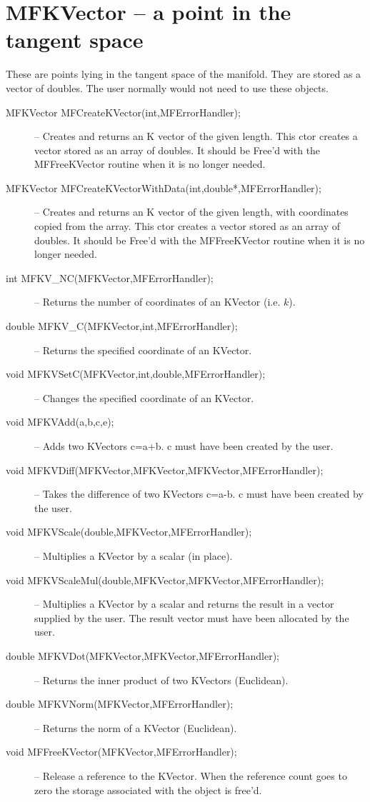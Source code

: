 \documentclass[12pt]{article}
\begin{document}
\section{MFKVector -- a point in the tangent space}
   These are points lying in the tangent space of the manifold. They are stored as a vector of doubles.  
The user normally would not need to use these objects.
\begin{description}
\item [MFKVector MFCreateKVector(int,MFErrorHandler);]
-- Creates and returns an K vector of the given length. This ctor creates a
vector stored as an array of doubles.
It should be Free'd with the MFFreeKVector routine when it is no longer needed.
\item [MFKVector MFCreateKVectorWithData(int,double*,MFErrorHandler);]
-- Creates and returns an K vector of the given length, with coordinates copied
from the array. This ctor creates a vector stored as an array of doubles.
It should be Free'd with the MFFreeKVector routine when it is no longer needed.
\item [int MFKV\_NC(MFKVector,MFErrorHandler);]
-- Returns the number of coordinates of an KVector (i.e. $k$).
\item [double MFKV\_C(MFKVector,int,MFErrorHandler);]
-- Returns the specified coordinate of an KVector.
\item [void MFKVSetC(MFKVector,int,double,MFErrorHandler);]
-- Changes the specified coordinate of an KVector.
\item [void MFKVAdd(a,b,c,e);]
-- Adds two KVectors {c=a+b}. {c} must have been created by the user.
\item [void MFKVDiff(MFKVector,MFKVector,MFKVector,MFErrorHandler);]
-- Takes the difference of two KVectors {c=a-b}. {c} must have been created by the user.
\item [void MFKVScale(double,MFKVector,MFErrorHandler);]
-- Multiplies a KVector by a scalar (in place).
\item [void MFKVScaleMul(double,MFKVector,MFKVector,MFErrorHandler);]
-- Multiplies a KVector by a scalar and returns the result in a vector supplied by the user. The
result vector must have been allocated by the user.
\item [double MFKVDot(MFKVector,MFKVector,MFErrorHandler);]
-- Returns the inner product of two KVectors (Euclidean).
\item [double MFKVNorm(MFKVector,MFErrorHandler);]
-- Returns the norm of a KVector (Euclidean).
\item [void MFFreeKVector(MFKVector,MFErrorHandler);]
-- Release a reference to the KVector. When the reference count goes to zero the
   storage associated with the object is free'd.
\end{description}
\end{document}
